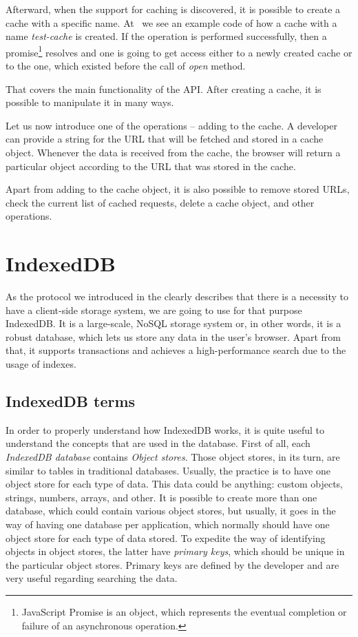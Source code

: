 Afterward, when the support for caching is discovered, it is possible to create a cache with a specific name. At~ we see an example code of how a cache with a name \textit{test-cache} is created. If the operation is performed successfully, then a promise\footnote{JavaScript Promise is an object, which represents the eventual completion or failure of an asynchronous operation.\cite{37}} resolves and one is going to get access either to a newly created cache or to the one, which existed before the call of \textit{open} method.

That covers the main functionality of the API. After creating a cache, it is possible to manipulate it in many ways. 

Let us now introduce one of the operations -- adding to the cache. A developer can provide a string for the URL that will be fetched and stored in a cache object. Whenever the data is received from the cache, the browser will return a particular object according to the URL that was stored in the cache. 

Apart from adding to the cache object, it is also possible to remove stored URLs, check the current list of cached requests, delete a cache object, and other operations.

\section{IndexedDB}

As the protocol we introduced in the  clearly describes that there is a necessity to have a client-side storage system, we are going to use for that purpose IndexedDB. It is a large-scale, NoSQL storage system\cite{35} or, in other words, it is a robust database, which lets us store any data in the user's browser. Apart from that, it supports transactions and achieves a high-performance search due to the usage of indexes. 

\subsection{IndexedDB terms}

In order to properly understand how IndexedDB works, it is quite useful to understand the concepts that are used in the database. First of all, each \textit{IndexedDB database} contains \textit{Object stores}. Those object stores, in its turn, are similar to tables in traditional databases. Usually, the practice is to have one object store for each type of data. This data could be anything: custom objects, strings, numbers, arrays, and other. It is possible to create more than one database, which could contain various object stores, but usually, it goes in the way of having one database per application, which normally should have one object store for each type of data stored. To expedite the way of identifying objects in object stores, the latter have \textit{primary keys}, which should be unique in the particular object stores. Primary keys are defined by the developer and are very useful regarding searching the data.

